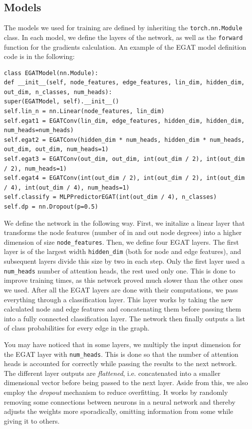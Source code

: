 \documentclass[times, utf8, diplomski, english]{fer_eng}
\begin{document}
\subsection{Models}

The models we used for training are defined by inheriting the \texttt{torch.nn.Module} class. In each model, we define the layers of the network, as well as the \texttt{forward} function for the gradients calculation. An example of the EGAT model definition code is in the following:

\begin{lstlisting}
class EGATModel(nn.Module):
def __init__(self, node_features, edge_features, lin_dim, hidden_dim, out_dim, n_classes, num_heads):
super(EGATModel, self).__init__()
self.lin_n = nn.Linear(node_features, lin_dim)
self.egat1 = EGATConv(lin_dim, edge_features, hidden_dim, hidden_dim, num_heads=num_heads)
self.egat2 = EGATConv(hidden_dim * num_heads, hidden_dim * num_heads, out_dim, out_dim, num_heads=1)
self.egat3 = EGATConv(out_dim, out_dim, int(out_dim / 2), int(out_dim / 2), num_heads=1)
self.egat4 = EGATConv(int(out_dim / 2), int(out_dim / 2), int(out_dim / 4), int(out_dim / 4), num_heads=1)
self.classify = MLPPredictorEGAT(int(out_dim / 4), n_classes)
self.dp = nn.Dropout(p=0.5)
\end{lstlisting}

We define the network in the following way. First, we initalize a linear layer that transforms the node features (number of in and out node degrees) into a higher dimension of size \texttt{node\_features}. Then, we define four EGAT layers. The first layer is of the largest width \texttt{hidden\_dim} (both for node and edge features), and subsequent layers divide this size by two in each step. Only the first layer used a \texttt{num\_heads} number of attention heads, the rest used only one. This is done to improve training times, as this network proved much slower than the other ones we used. After all the EGAT layers are done with their computations, we pass everything through a classification layer. This layer works by taking the new calculated node and edge features and concatenating them before passing them into a fully connected classification layer. The network then finally outputs a list of class probabilities for every edge in the graph.

You may have noticed that in some layers, we multiply the input dimension for the EGAT layer with \texttt{num\_heads}. This is done so that the number of attention heads is accounted for correctly while passing the results to the next network. The different layer outputs are \textit{flattened}, i.e. concatenated into a smaller dimensional vector before being passed to the next layer. Aside from this, we also employ the \textit{dropout} \cite{dropout} mechanism to reduce overfitting. It works by randomly removing some connections between neurons in a neural network and thereby adjusts the weights more sporadically, omitting information from some while giving it to others.
\end{document}
